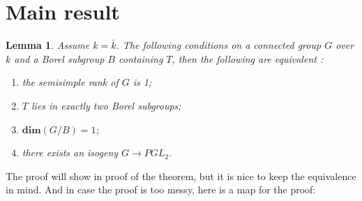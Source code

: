 \documentclass[12pt,a4paper,english]{article}
\theoremstyle{plain}
\newtheorem{lem}[thm]{Lemma}
\theoremstyle{definition}
\begin{document}
\section{Main result}
\begin{lem}
Assume $k=\bar{k}$. The following conditions on a connected group $G$ over $k$ and a Borel subgroup $B$ containing $T$, then the following are equivalent \cite{milneiAG}:
\begin{enumerate}
    \item the semisimple rank of $G$ is 1;
    \item $T$ lies in exactly two Borel subgroups; 
    \item $\textbf{dim}(G/B)=1$;
    \item there exists an isogeny $G\rightarrow PGL_{2}$.
\end{enumerate}
\end{lem}
The proof will show in proof of the theorem, but it is nice to keep the equivalence in mind. And in case the proof is too messy, here is a map for the proof:
\begin{center}

\end{center}
\end{document}

